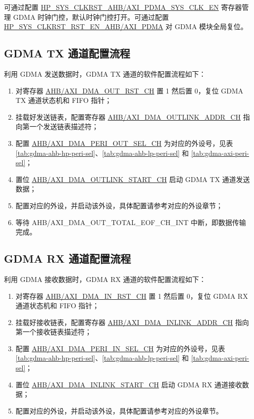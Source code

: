 \documentclass[main\_\_CN.tex]{subfiles}
\begin{document}
可通过配置 \hyperref[fielddesc:HPSYSCLKRSTAHBPDMASYSCLKEN]{HP\_SYS\_CLKRST\_AHB/AXI\_PDMA\_SYS\_CLK\_EN} 寄存器管理 GDMA 时钟门控，默认时钟门控打开。可通过配置 \hyperref[fielddesc:HPSYSCLKRSTRSTENAHBPDMA]{HP\_SYS\_CLKRST\_RST\_EN\_AHB/AXI\_PDMA} 对 GDMA 模块全局复位。

\subsection{GDMA TX 通道配置流程}
利用 GDMA 发送数据时，GDMA TX 通道的软件配置流程如下：
\begin{enumerate}
    \item 对寄存器 \hyperref[fielddesc:AHBDMAOUTRSTCHN]{AHB/AXI\_DMA\_OUT\_RST\_CH} 置 1 然后置 0，复位 GDMA TX 通道状态机和 FIFO 指针；
    \item 挂载好发送链表，配置寄存器 \hyperref[fielddesc:AHBDMAOUTLINKADDRCHN]{AHB/AXI\_DMA\_OUTLINK\_ADDR\_CH} 指向第一个发送链表描述符；
    \item 配置 \hyperref[fielddesc:AHBDMAPERIOUTSELCHN]{AHB/AXI\_DMA\_PERI\_OUT\_SEL\_CH} 为对应的外设号，见表 \ref{tab:gdma-ahb-hp-peri-sel}、\ref{tab:gdma-ahb-lp-peri-sel} 和 \ref{tab:gdma-axi-peri-sel}；
    \item 置位 \hyperref[fielddesc:AHBDMAOUTLINKSTARTCHN]{AHB/AXI\_DMA\_OUTLINK\_START\_CH} 启动 GDMA TX 通道发送数据；
    \item 配置对应的外设，并启动该外设，具体配置请参考对应的外设章节；
    \item 等待 AHB/AXI\_DMA\_OUT\_TOTAL\_EOF\_CH\_INT 中断，即数据传输完成。
\end{enumerate}

\subsection{GDMA RX 通道配置流程}
利用 GDMA 接收数据时，GDMA RX 通道的软件配置流程如下：
\begin{enumerate}
    \item 对寄存器 \hyperref[fielddesc:AHBDMAINRSTCHN]{AHB/AXI\_DMA\_IN\_RST\_CH} 置 1 然后置 0，复位 GDMA RX 通道状态机和 FIFO 指针；
    \item 挂载好接收链表，配置寄存器 \hyperref[fielddesc:AHBDMAINLINKADDRCHN]{AHB/AXI\_DMA\_INLINK\_ADDR\_CH} 指向第一个接收链表描述符；
    \item 配置 \hyperref[fielddesc:AHBDMAPERIINSELCHN]{AHB/AXI\_DMA\_PERI\_IN\_SEL\_CH} 为对应的外设号，见表 \ref{tab:gdma-ahb-hp-peri-sel}、\ref{tab:gdma-ahb-lp-peri-sel} 和 \ref{tab:gdma-axi-peri-sel}；
    \item 置位 \hyperref[fielddesc:AHBDMAINLINKSTARTCHN]{AHB/AXI\_DMA\_INLINK\_START\_CH} 启动 GDMA RX 通道接收数据；
    \item 配置对应的外设，并启动该外设，具体配置请参考对应的外设章节。
\end{enumerate}
\end{document}
